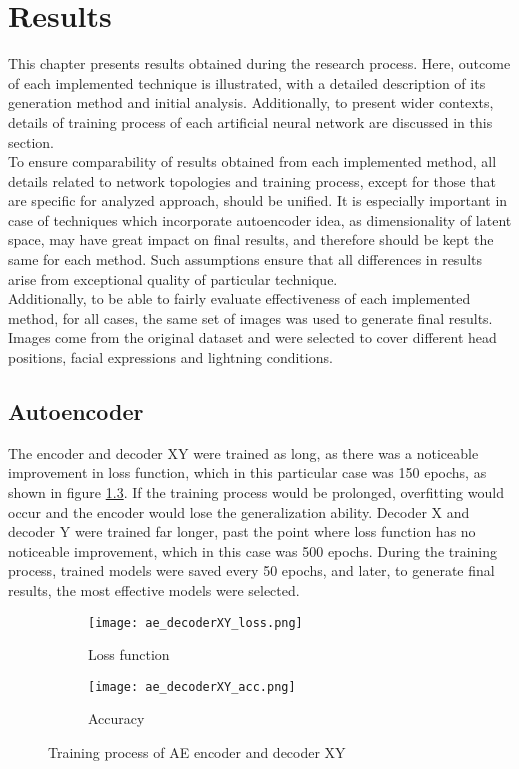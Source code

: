 \chapter{Results}
This chapter presents results obtained during the research process. Here, outcome of each implemented technique is illustrated, with a detailed description of its generation method and initial analysis. Additionally, to present wider contexts, details of training process of each artificial neural network are discussed in this section.\\

To ensure comparability of results obtained from each implemented method, all details related to network topologies and training process, except for those that are specific for analyzed approach, should be unified. It is especially important in case of techniques which incorporate autoencoder idea, as dimensionality of latent space, may have great impact on final results, and therefore should be kept the same for each method. Such assumptions ensure that all differences in results arise from exceptional quality of particular technique.\\

Additionally, to be able to fairly evaluate effectiveness of each implemented method, for all cases, the same set of images was used to generate final results. Images come from the original dataset and were selected to cover different head positions, facial expressions and lightning conditions.

\newpage
\section{Autoencoder}
\label{Results_Autoencoder}
The encoder and decoder XY were trained as long, as there was a noticeable improvement in loss function, which in this particular case was 150 epochs, as shown in figure \ref{fig:ae_decoderXY}. If the training process would be prolonged, overfitting would occur and the encoder would lose the generalization ability. Decoder X and decoder Y were trained far longer, past the point where loss function has no noticeable improvement, which in this case was 500 epochs. During the training process, trained models were saved every 50 epochs, and later, to generate final results, the most effective models were selected.

\begin{figure}[H]
\centering
\begin{subfigure}{.5\textwidth}
  \centering
  \texttt{[image: ae\_decoderXY\_loss.png]}
  \caption{Loss function}
  \label{subfig:ae_decoderXY_loss}
\end{subfigure}%
\begin{subfigure}{.5\textwidth}
  \centering
  \texttt{[image: ae\_decoderXY\_acc.png]}
  \caption{Accuracy}
  \label{subfig:ae_decoderXY_acc}
\end{subfigure}
\caption{Training process of AE encoder and decoder XY}
\label{fig:ae_decoderXY}
\end{figure}

